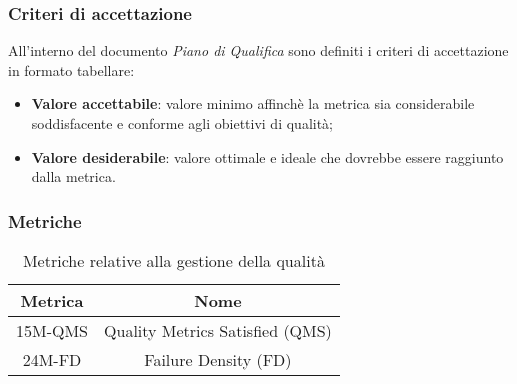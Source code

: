 \subsubsection{Criteri di accettazione}
All'interno del documento \textit{Piano di Qualifica} sono definiti i criteri di accettazione in formato tabellare:
\begin{itemize}
    \item \textbf{Valore accettabile}: valore minimo affinchè la metrica sia considerabile soddisfacente e conforme agli obiettivi di qualità;
    \item \textbf{Valore desiderabile}: valore ottimale e ideale che dovrebbe essere raggiunto dalla metrica.
\end{itemize}

\subsubsection{Metriche}
\begin{table}[h]
    \centering
    \caption{Metriche relative alla gestione della qualità}
    \begin{tabular}{|c|c|}
    \hline
    \textbf{Metrica} & \textbf{Nome} \\
    \hline
    15M-QMS & Quality Metrics Satisfied (QMS) \\
    24M-FD & Failure Density (FD) \\
    \hline
    \end{tabular}
\end{table}
